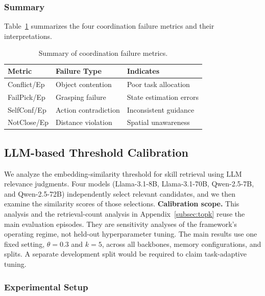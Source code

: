 \documentclass{article}
\theoremstyle{plain}
\theoremstyle{definition}
\theoremstyle{remark}
\begin{document}
\subsubsection{Summary}

Table~\ref{tab:failure_metrics_summary} summarizes the four coordination failure metrics and their interpretations.

\begin{table}[h]
\centering
\caption{Summary of coordination failure metrics.}
\label{tab:failure_metrics_summary}
\begin{tabular}{lll}
\toprule
\textbf{Metric} & \textbf{Failure Type} & \textbf{Indicates} \\
\midrule
Conflict/Ep & Object contention & Poor task allocation \\
FailPick/Ep & Grasping failure & State estimation errors \\
SelfConf/Ep & Action contradiction & Inconsistent guidance \\
NotClose/Ep & Distance violation & Spatial unawareness \\
\bottomrule
\end{tabular}
\end{table}



\subsection{LLM-based Threshold Calibration}
\label{sec:threshold_calibration}

We analyze the embedding-similarity threshold for skill retrieval using LLM relevance judgments. Four models (Llama-3.1-8B, Llama-3.1-70B, Qwen-2.5-7B, and Qwen-2.5-72B) independently select relevant candidates, and we then examine the similarity scores of those selections. \textbf{Calibration scope.} This analysis and the retrieval-count analysis in Appendix~\ref{subsec:topk} reuse the main evaluation episodes. They are sensitivity analyses of the framework's operating regime, not held-out hyperparameter tuning. The main results use one fixed setting, $\theta=0.3$ and $k=5$, across all backbones, memory configurations, and splits. A separate development split would be required to claim task-adaptive tuning.

\subsubsection{Experimental Setup}
\label{subsec:threshold_setup}
\end{document}
